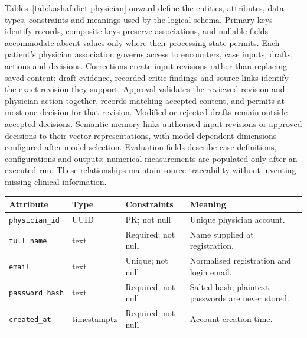 Tables~\ref{tab:kashaf:dict-physician} onward define the entities, attributes, data types, constraints and meanings used by the logical schema. Primary keys identify records, composite keys preserve associations, and nullable fields accommodate absent values only where their processing state permits. Each patient's physician association governs access to encounters, case inputs, drafts, actions and decisions. Corrections create input revisions rather than replacing saved content; draft evidence, recorded critic findings and source links identify the exact revision they support. Approval validates the reviewed revision and physician action together, records matching accepted content, and permits at most one decision for that revision. Modified or rejected drafts remain outside accepted decisions. Semantic memory links authorised input revisions or approved decisions to their vector representations, with model-dependent dimensions configured after model selection. Evaluation fields describe case definitions, configurations and outputs; numerical measurements are populated only after an executed run. These relationships maintain source traceability without inventing missing clinical information.

\begin{reporttable}
\setlength{\tabcolsep}{5pt}
\centering
\small
\caption{Physician attributes, types and constraints.}
\label{tab:kashaf:dict-physician}
\begin{tabular}{|p{}|p{}|p{}|p{}|}
\hline
Attribute & Type & Constraints & Meaning \\ \hline
\texttt{physician\_id} & UUID & PK; not null & Unique physician account. \\ \hline
\texttt{full\_name} & text & Required; not null & Name supplied at registration. \\ \hline
\texttt{email} & text & Unique; not null & Normalised registration and login email. \\ \hline
\texttt{password\_hash} & text & Required; not null & Salted hash; plaintext passwords are never stored. \\ \hline
\texttt{created\_at} & timestamptz & Required; not null & Account creation time. \\ \hline
\end{tabular}
\end{reporttable}

